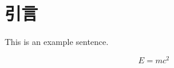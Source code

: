 
\chapter{引言}
\pkuthssffaq %

This is an example sentence.

\begin{equation}
    E = mc^{2}
\end{equation}

